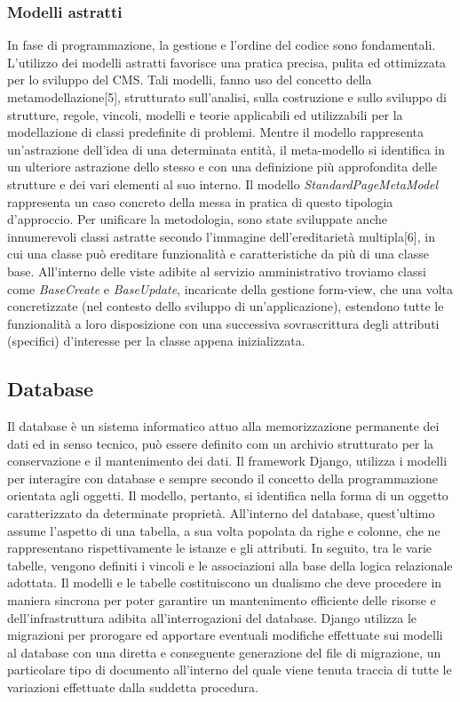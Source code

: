 \subsubsection{Modelli astratti}
In fase di programmazione, la gestione e l'ordine del codice sono fondamentali. L'utilizzo dei modelli astratti favorisce una pratica precisa, pulita ed ottimizzata per lo sviluppo del CMS.\hfill \break
Tali modelli, fanno uso del concetto della metamodellazione[5], strutturato sull'analisi, sulla costruzione e sullo sviluppo di strutture, regole, vincoli, modelli e teorie applicabili ed utilizzabili per la modellazione di classi predefinite di problemi.
Mentre il modello rappresenta un'astrazione dell'idea di una determinata entità, il meta-modello si identifica in un ulteriore astrazione dello stesso e con una definizione più approfondita delle strutture e dei vari elementi al suo interno. \hfill \break
Il modello \textit{StandardPageMetaModel} rappresenta un caso concreto della messa in pratica di questo tipologia d'approccio.
Per unificare la metodologia, sono state sviluppate anche innumerevoli classi astratte secondo l'immagine dell'ereditarietà multipla[6], in cui una classe può ereditare funzionalità e caratteristiche da più di una classe base. \hfill \break
All'interno delle viste adibite al servizio amministrativo troviamo classi come \textit{BaseCreate} e \textit{BaseUpdate}, incaricate della gestione form-view, che una volta concretizzate (nel contesto dello sviluppo di un'applicazione), estendono tutte le funzionalità a loro disposizione con una successiva sovrascrittura degli attributi (specifici) d'interesse per la classe appena inizializzata.


\subsection{Database}
Il database è un sistema informatico attuo alla memorizzazione permanente dei dati ed in senso tecnico, può essere definito com un archivio strutturato per la conservazione e il mantenimento dei dati. Il framework Django, utilizza i modelli per interagire con database e sempre secondo il concetto della programmazione orientata agli oggetti. \hfill \break
Il modello, pertanto, si identifica nella forma di un oggetto caratterizzato da determinate proprietà. All'interno del database, quest'ultimo assume l'aspetto di una tabella, a sua volta popolata da righe e colonne, che ne rappresentano rispettivamente le istanze e gli attributi. In seguito, tra le varie tabelle, vengono definiti i vincoli e le associazioni alla base della logica relazionale adottata.
Il modelli e le tabelle costituiscono un dualismo che deve procedere in maniera sincrona per poter garantire un mantenimento efficiente delle risorse e dell'infrastruttura adibita all'interrogazioni del database.
Django utilizza le migrazioni per prorogare ed apportare eventuali modifiche effettuate sui modelli al database con una diretta e conseguente generazione del file di migrazione, un particolare tipo di documento all'interno del quale viene tenuta traccia di tutte le variazioni effettuate dalla suddetta procedura.

